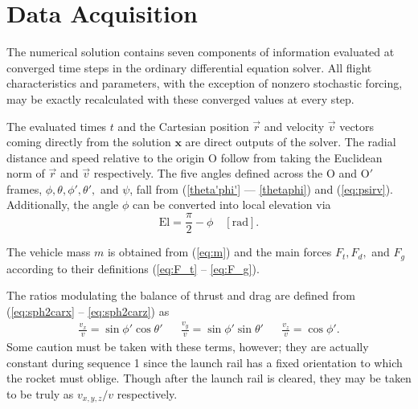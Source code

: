 \documentclass[11pt]{thesis}
\numberwithin{equation}{section}
\begin{document}

\section{Data Acquisition}
The numerical solution contains seven components of information evaluated at converged time steps in the ordinary differential equation solver. All flight characteristics and parameters, with the exception of nonzero stochastic forcing, may be exactly recalculated with these converged values at every step.

The evaluated times $t$ and the Cartesian position $\vec{r}$ and velocity $\vec{v}$ vectors coming directly from the solution $\mathbf{x}$ are direct outputs of the solver. The radial distance and speed relative to the origin $\mathrm{O}$ follow from taking the Euclidean norm of $\vec{r}$ and $\vec{v}$ respectively. The five angles defined across the $\mathrm{O}$ and $\mathrm{O}'$ frames, $\phi, \theta, \phi', \theta',$ and $\psi$, fall from (\ref{theta'phi'} --- \ref{thetaphi}) and (\ref{eq:psirv}). Additionally, the angle $\phi$ can be converted into local elevation via
\begin{equation}
\mathrm{El} = \frac{\pi}{2} - \phi \quad [\si{\radian}].
\end{equation}

The vehicle mass $m$ is obtained from (\ref{eq:m}) and the main forces $F_t, F_d,$ and $F_g$ according to their definitions (\ref{eq:F_t} -- \ref{eq:F_g}).

The ratios modulating the balance of thrust and drag are defined from (\ref{eq:sph2carx} -- \ref{eq:sph2carz}) as
\begin{align}
\frac{v_x}{v} = \sin \phi' \cos \theta' && \frac{v_y}{v} = \sin \phi' \sin \theta' && \frac{v_z}{v} = \cos \phi'.
\end{align}
Some caution must be taken with these terms, however; they are actually constant during sequence 1 since the launch rail has a fixed orientation to which the rocket must oblige. Though after the launch rail is cleared, they may be taken to be truly as $v_{x,y,z}/v$ respectively.
\end{document}
